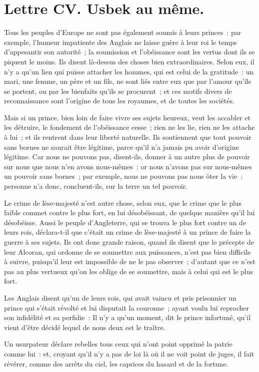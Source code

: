 \documentclass[french,twoside]{book} %
\newcommand{\dateline}[1]{\medskip{\RaggedLeft{#1}\par}\bigskip}
\begin{document}
\dateline{De Paris, le 17 de la lune de Rebiab 2, 1717.}
\section[{Lettre CV. Usbek au même.}]{Lettre CV. Usbek au même.}\renewcommand{\leftmark}{Lettre CV. Usbek au même.}

\noindent Tous les peuples d’Europe ne sont pas également soumis à leurs princes : par exemple, l’humeur impatiente des Anglais ne laisse guère à leur roi le temps d’appesantir son autorité ; la soumission et l’obéissance sont les vertus dont ils se piquent le moins. Ils disent là-dessus des choses bien extraordinaires. Selon eux, il n’y a qu’un lien qui puisse attacher les hommes, qui est celui de la gratitude : un mari, une femme, un père et un fils, ne sont liés entre eux que par l’amour qu’ils se portent, ou par les bienfaits qu’ils se procurent ; et ces motifs divers de reconnaissance sont l’origine de tous les royaumes, et de toutes les sociétés.\par
Mais si un prince, bien loin de faire vivre ses sujets heureux, veut les accabler et les détruire, le fondement de l’obéissance cesse ; rien ne les lie, rien ne les attache à lui ; et ils rentrent dans leur liberté naturelle. Ils soutiennent que tout pouvoir sans bornes ne saurait être légitime, parce qu’il n’a jamais pu avoir d’origine légitime. Car nous ne pouvons pas, disent-ils, donner à un autre plus de pouvoir sur nous que nous n’en avons nous-mêmes : or nous n’avons pas sur nous-mêmes un pouvoir sans bornes ; par exemple, nous ne pouvons pas nous ôter la vie : personne n’a donc, concluent-ils, sur la terre un tel pouvoir.\par
Le crime de lèse-majesté n’est autre chose, selon eux, que le crime que le plus faible commet contre le plus fort, en lui désobéissant, de quelque manière qu’il lui désobéisse. Aussi le peuple d’Angleterre, qui se trouva le plus fort contre un de leurs rois, déclara-t-il que c’était un crime de lèse-majesté à un prince de faire la guerre à ses sujets. Ils ont donc grande raison, quand ils disent que le précepte de leur Alcoran, qui ordonne de se soumettre aux puissances, n’est pas bien difficile à suivre, puisqu’il leur est impossible de ne le pas observer ; d’autant que ce n’est pas au plus vertueux qu’on les oblige de se soumettre, mais à celui qui est le plus fort.\par
Les Anglais disent qu’un de leurs rois, qui avait vaincu et pris prisonnier un prince qui s’était révolté et lui disputait la couronne ; ayant voulu lui reprocher son infidélité et sa perfidie : Il n’y a qu’un moment, dit le prince infortuné, qu’il vient d’être décidé lequel de nous deux est le traître.\par
Un usurpateur déclare rebelles tous ceux qui n’ont point opprimé la patrie comme lui : et, croyant qu’il n’y a pas de loi là où il ne voit point de juges, il fait révérer, comme des arrêts du ciel, les caprices du hasard et de la fortune.\par
\end{document}
